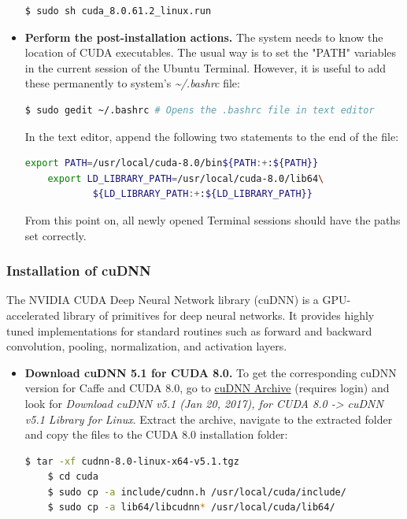 \begin{itemize}
	\begin{lstlisting}[language=bash]
	$ sudo sh cuda_8.0.61.2_linux.run
	\end{lstlisting}
	
	\item \textbf{Perform the post-installation actions.} The system needs to know the location of CUDA executables. The usual way is to set the "PATH" variables in the current session of the Ubuntu Terminal. However, it is useful to add these permanently to system's \textit{\textasciitilde{}/.bashrc} file: \cite{nvidia_dev}
		
	\begin{lstlisting}[language=bash]
	$ sudo gedit ~/.bashrc # Opens the .bashrc file in text editor
	\end{lstlisting}
	
	In the text editor, append the following two statements to the end of the file:
	
	\begin{lstlisting}[language=bash]
	export PATH=/usr/local/cuda-8.0/bin${PATH:+:${PATH}}
	export LD_LIBRARY_PATH=/usr/local/cuda-8.0/lib64\
			${LD_LIBRARY_PATH:+:${LD_LIBRARY_PATH}}
	\end{lstlisting}	
	
	From this point on, all newly opened Terminal sessions should have the paths set correctly.
	
\end{itemize}

\subsubsection{Installation of cuDNN}

The NVIDIA CUDA Deep Neural Network library (cuDNN) is a GPU-accelerated library of primitives for deep neural networks. It provides highly tuned implementations for standard routines such as forward and backward convolution, pooling, normalization, and activation layers. \cite{nvidia_dev} 

\begin{itemize}
	\item \textbf{Download cuDNN 5.1 for CUDA 8.0.} To get the corresponding cuDNN version for Caffe and CUDA 8.0, go to \href{https://developer.nvidia.com/rdp/cudnn-archive}{cuDNN Archive} (requires login) and look for \textit{Download cuDNN v5.1 (Jan 20, 2017), for CUDA 8.0 -> cuDNN v5.1 Library for Linux}. Extract the archive, navigate to the extracted folder and copy the files to the CUDA 8.0 installation folder: \cite{nvidia_dev} 
	
	\newpage
	\begin{lstlisting}[language=bash]
	$ tar -xf cudnn-8.0-linux-x64-v5.1.tgz 
	$ cd cuda
	$ sudo cp -a include/cudnn.h /usr/local/cuda/include/
	$ sudo cp -a lib64/libcudnn* /usr/local/cuda/lib64/
	\end{lstlisting}	
\end{itemize}

